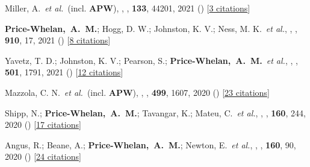 \item[{\color{deemph}\scriptsize72}]Miller, A.~\textit{et al.}~(incl. \textbf{APW}), , \pasp, \textbf{133}, 44201, 2021 () [\href{http://adsabs.harvard.edu/abs/2021PASP..133d4201M}{3 citations}]

\item[{\color{deemph}\scriptsize71}]\textbf{Price-Whelan,~A.~M.}; Hogg, D. W.; Johnston, K. V.; Ness, M. K.~\textit{et al.}, , \apj, \textbf{910}, 17, 2021 () [\href{http://adsabs.harvard.edu/abs/2021ApJ...910...17P}{8 citations}]

\item[{\color{deemph}\scriptsize70}]Yavetz, T. D.; Johnston, K. V.; Pearson, S.; \textbf{Price-Whelan,~A.~M.}~\textit{et al.}, , \mnras, \textbf{501}, 1791, 2021 () [\href{http://adsabs.harvard.edu/abs/2021MNRAS.501.1791Y}{12 citations}]

\item[{\color{deemph}\scriptsize69}]Mazzola, C. N.~\textit{et al.}~(incl. \textbf{APW}), , \mnras, \textbf{499}, 1607, 2020 () [\href{http://adsabs.harvard.edu/abs/2020MNRAS.499.1607M}{23 citations}]

\item[{\color{deemph}\scriptsize68}]Shipp, N.; \textbf{Price-Whelan,~A.~M.}; Tavangar, K.; Mateu, C.~\textit{et al.}, , \aj, \textbf{160}, 244, 2020 () [\href{http://adsabs.harvard.edu/abs/2020AJ....160..244S}{17 citations}]

\item[{\color{deemph}\scriptsize67}]Angus, R.; Beane, A.; \textbf{Price-Whelan,~A.~M.}; Newton, E.~\textit{et al.}, , \aj, \textbf{160}, 90, 2020 () [\href{http://adsabs.harvard.edu/abs/2020AJ....160...90A}{24 citations}]

